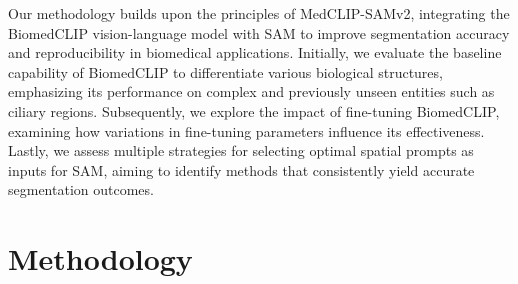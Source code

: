 \documentclass[./dissertation.tex]{subfiles}
\begin{document}

Our methodology builds upon the principles of MedCLIP-SAMv2, integrating the BiomedCLIP vision-language model with SAM to improve segmentation accuracy and reproducibility in biomedical applications. Initially, we evaluate the baseline capability of BiomedCLIP to differentiate various biological structures, emphasizing its performance on complex and previously unseen entities such as ciliary regions. Subsequently, we explore the impact of fine-tuning BiomedCLIP, examining how variations in fine-tuning parameters influence its effectiveness. Lastly, we assess multiple strategies for selecting optimal spatial prompts as inputs for SAM, aiming to identify methods that consistently yield accurate segmentation outcomes.

\section{Methodology}
\end{document}
